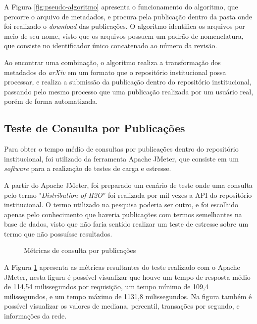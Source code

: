 A Figura \ref{fig:pseudo-algoritmo} apresenta o funcionamento do algoritmo, que percorre o arquivo
de metadados, e procura pela publicação dentro da pasta onde foi realizado o \emph{download} das publicações.
O algoritmo identifica os arquivos por meio de seu nome, visto que os arquivos possuem um padrão de nomenclatura,
que consiste no identificador único concatenado ao número da revisão.

Ao encontrar uma combinação, o algoritmo realiza a transformação dos metadados do
\emph{arXiv} em um formato que o repositório institucional possa processar, e realiza
a submissão da publicação dentro do repositório institucional, passando pelo mesmo
processo que uma publicação realizada por um usuário real, porém de forma automatizada.

\subsection{Teste de Consulta por Publicações}

Para obter o tempo médio de consultas por publicações dentro do repositório
institucional, foi utilizado da ferramenta Apache JMeter, que consiste em um
\emph{software} para a realização de testes de carga e estresse.

A partir do Apache JMeter, foi preparado um cenário de teste onde uma consulta
pelo termo "\emph{Distribution of H2O}'' foi realizada por mil vezes a API do
repositório institucional. O termo utilizado na pesquisa poderia ser outro, e
foi escolhido apenas pelo conhecimento que haveria publicações com termos semelhantes
na base de dados, visto que não faria sentido realizar um teste de estresse sobre um termo
que não possuísse resultados.

\begin{figure}[H]
    \caption{Métricas de consulta por publicações}
    \label{fig:matrics-advanced-search}
\end{figure}

A Figura \ref{fig:matrics-advanced-search} apresenta as métricas resultantes do teste
realizado com o Apache JMeter, nesta figura é possível visualizar que houve um tempo de
resposta médio de 114,54 milissegundos por requisição, um tempo mínimo de 109,4
milissegundos, e um tempo máximo de 1131,8 milissegundos. Na figura também é possível
visualizar os valores de mediana, percentil, transações por segundo, e informações da
rede.

